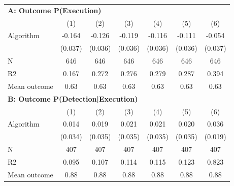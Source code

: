 \begin{tabular}{lcccccc} \toprule
\multicolumn{7}{l}{\textbf{A: Outcome P(Execution)}} \\ \multicolumn{1}{l}{} & (1) & (2) & (3) & (4) & (5) & (6) \\ \midrule
Algorithm   &      -0.164\sym{***}&      -0.126\sym{***}&      -0.119\sym{***}&      -0.116\sym{***}&      -0.111\sym{***}&      -0.054         \\
            &     (0.037)         &     (0.036)         &     (0.036)         &     (0.036)         &     (0.036)         &     (0.037)         \\
\midrule
N           &         646         &         646         &         646         &         646         &         646         &         646         \\
R2          &       0.167         &       0.272         &       0.276         &       0.279         &       0.287         &       0.394         \\
Mean outcome&        0.63         &        0.63         &        0.63         &        0.63         &        0.63         &        0.63         \\

\midrule \multicolumn{7}{l}{\textbf{B: Outcome P(Detection|Execution)}} \\ \multicolumn{1}{l}{} & (1) & (2) & (3) & (4) & (5) & (6) \\ \midrule
Algorithm   &       0.014         &       0.019         &       0.021         &       0.021         &       0.020         &       0.036\sym{*}  \\
            &     (0.034)         &     (0.035)         &     (0.035)         &     (0.035)         &     (0.035)         &     (0.019)         \\
\midrule
N           &         407         &         407         &         407         &         407         &         407         &         407         \\
R2          &       0.095         &       0.107         &       0.114         &       0.115         &       0.123         &       0.823         \\
Mean outcome&        0.88         &        0.88         &        0.88         &        0.88         &        0.88         &        0.88         \\


\end{tabular}
